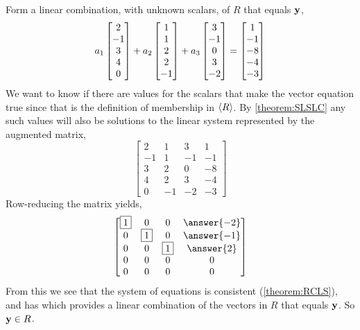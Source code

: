 \documentclass{ximera}
\begin{document}
\begin{exercise}
  \begin{question}
    Form a linear combination, with unknown scalars, of $R$ that equals $\mathbf{y}$,
    \[
      a_1\begin{bmatrix}2\\-1\\3\\4\\0\end{bmatrix}+
      a_2\begin{bmatrix}1\\1\\2\\2\\-1\end{bmatrix}+
      a_3\begin{bmatrix}3\\-1\\0\\3\\-2\end{bmatrix}
      =
      \begin{bmatrix}1\\-1\\-8\\-4\\-3\end{bmatrix}
    \]
    We want to know if there are values for the scalars that make the vector equation true since that is the definition of membership in $\left\langle R\right\rangle$.  By \ref{theorem:SLSLC} any such values will also be solutions to the linear system represented by the augmented matrix,
    \[
      \begin{bmatrix}
        2 & 1 & 3 & 1\\
        -1 & 1 & -1 & -1\\
        3 & 2 & 0 & -8\\
        4 & 2 & 3 & -4\\
        0 & -1 & -2 & -3
      \end{bmatrix}
    \]
    Row-reducing the matrix yields,
    \[
      \begin{bmatrix}
        \leading{1} & 0 & 0 & \answer{-2}\\
        0 & \leading{1} & 0 & \answer{-1}\\
        0 & 0 & \leading{1} & \answer{2}\\
        0 & 0 & 0 & 0\\
        0 & 0 & 0 & 0
      \end{bmatrix}
    \]
    From this we see that the system of equations is consistent
    (\ref{theorem:RCLS}), and has  which
    provides a linear combination of the vectors in $R$ that equals
    $\mathbf{y}$.  So $\mathbf{y}\in R$.
  \end{question}
\end{exercise}
\end{document}
